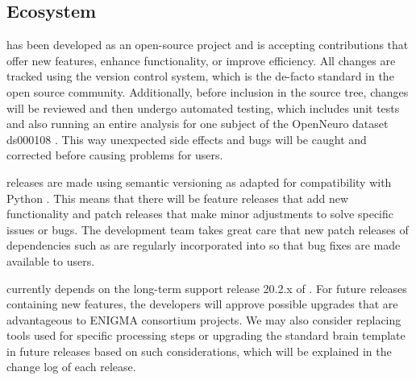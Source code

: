 \subsection{Ecosystem}

 has been developed as an open-source project and is accepting contributions that offer new features, enhance functionality, or improve efficiency. All changes are tracked using the  version control system, which is the de-facto standard in the open source community. Additionally, before inclusion in the source tree, changes will be reviewed and then undergo automated testing, which includes unit tests and also running an entire analysis for one subject of the OpenNeuro dataset ds000108 \parencite{wager2008}. This way unexpected side effects and bugs will be caught and corrected before causing problems for users.

 releases are made using semantic versioning as adapted for compatibility with Python \parencite{coghlan2013}. This means that there will be feature releases that add new functionality and patch releases that make minor adjustments to solve specific issues or bugs. The development team takes great care that new patch releases of dependencies such as  are regularly incorporated into  so that bug fixes are made available to users.

 currently depends on the long-term support release 20.2.x of . For future releases containing new features, the developers will approve  possible upgrades that are advantageous to ENIGMA consortium projects. We may also consider replacing tools used for specific processing steps or upgrading the standard brain template in future releases based on such considerations, which will be explained in the change log of each release.
